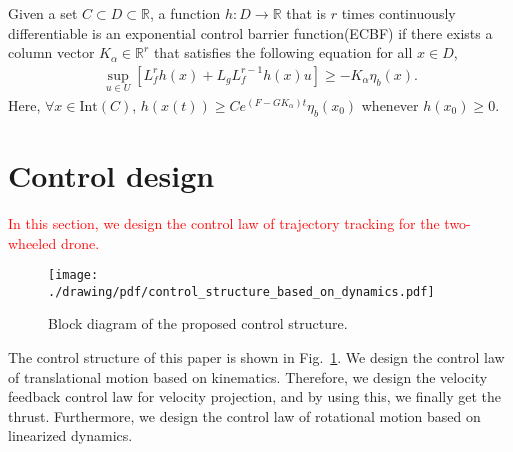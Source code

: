 
\begin{definition}
    \cite{amesControlBarrierFunctions2019a}
    Given a set $ C \subset D \subset \mathbb{R} $, a function $ h : D \rightarrow \mathbb{R} $ that is $ r $ times continuously differentiable is an exponential control barrier function(ECBF) if there exists a column vector $ K_{\alpha} \in \mathbb{R}^r $ that satisfies the following equation for all $ x \in D $,
    \begin{align}
        \label{eq:definition_of_ECBF}
        \sup_{u \in U} [ L_f^r h(x) + L_g L_f^{r-1} h(x) u] \geq - K_{\alpha} \eta_b (x).
    \end{align}
    Here, $ \forall x \in \mathrm{Int} (C) $, $ h(x(t)) \geq C e^{(F - GK_{\alpha})t} \eta_b (x_0) $ whenever $ h(x_0) \geq 0 $.
\end{definition}

\section{Control design}
\label{sec:control_design}

\textcolor{red}{In this section, we design the control law of trajectory tracking for the two-wheeled drone.}
\begin{figure}[t]
\centering
\texttt{[image: ./drawing/pdf/control\_structure\_based\_on\_dynamics.pdf]}
\caption{Block diagram of the proposed control structure.}
\label{fig:block_diagram_of_the_proposed_control_structure}
\end{figure}
The control structure of this paper is shown in Fig.~\ref{fig:block_diagram_of_the_proposed_control_structure}.
We design the control law of translational motion based on kinematics. 
Therefore, we design the velocity feedback control law for velocity projection, and by using this, we finally get the thrust.
Furthermore, we design the control law of rotational motion based on linearized dynamics.
